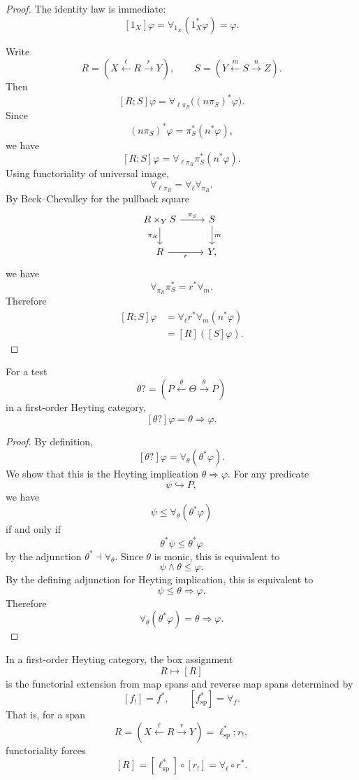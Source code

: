 \begin{proof}
The identity law is immediate:
\[
[1_X]\varphi
=
\forall_{1_X}(1_X^\ast\varphi)
=
\varphi.
\]

Write
\[
R=
\left(
X\xleftarrow{\ell}R\xrightarrow{r}Y
\right),
\qquad
S=
\left(
Y\xleftarrow{m}S\xrightarrow{n}Z
\right).
\]
Then
\[
[R;S]\varphi
=
\forall_{\ell\pi_R}\bigl((n\pi_S)^\ast\varphi\bigr).
\]
Since
\[
(n\pi_S)^\ast\varphi
=
\pi_S^\ast(n^\ast\varphi),
\]
we have
\[
[R;S]\varphi
=
\forall_{\ell\pi_R}\pi_S^\ast(n^\ast\varphi).
\]
Using functoriality of universal image,
\[
\forall_{\ell\pi_R}
=
\forall_\ell\forall_{\pi_R}.
\]
By Beck--Chevalley for the pullback square
\[
\begin{tikzcd}
R\times_Y S \arrow[r, "\pi_S"] \arrow[d, "\pi_R"']
&
S \arrow[d, "m"]
\\
R \arrow[r, "r"'] & Y,
\end{tikzcd}
\]
we have
\[
\forall_{\pi_R}\pi_S^\ast
=
r^\ast\forall_m.
\]
Therefore
\[
\begin{aligned}
[R;S]\varphi
&=
\forall_\ell r^\ast\forall_m(n^\ast\varphi)
\\
&=
[R]([S]\varphi).
\end{aligned}
\]
\end{proof}

\begin{proposition}
\label{prop:box-law-tests}
For a test
\[
\theta?
=
\left(
P\xleftarrow{\theta}\Theta\xrightarrow{\theta}P
\right)
\]
in a first-order Heyting category,
\[
[\theta?]\varphi
=
\theta\Rightarrow\varphi.
\]
\end{proposition}

\begin{proof}
By definition,
\[
[\theta?]\varphi
=
\forall_\theta(\theta^\ast\varphi).
\]
We show that this is the Heyting implication \(\theta\Rightarrow\varphi\). For any predicate
\[
\psi\hookrightarrow P,
\]
we have
\[
\psi\le \forall_\theta(\theta^\ast\varphi)
\]
if and only if
\[
\theta^\ast\psi\le \theta^\ast\varphi
\]
by the adjunction \(\theta^\ast\dashv \forall_\theta\). Since \(\theta\) is monic, this is equivalent to
\[
\psi\wedge\theta\le \varphi.
\]
By the defining adjunction for Heyting implication, this is equivalent to
\[
\psi\le \theta\Rightarrow\varphi.
\]
Therefore
\[
\forall_\theta(\theta^\ast\varphi)
=
\theta\Rightarrow\varphi.
\]
\end{proof}

\begin{theorem}
\label{thm:universal-box-extension}
In a first-order Heyting category, the box assignment
\[
R\longmapsto [R]
\]
is the functorial extension from map spans and reverse map spans determined by
\[
[f_!]=f^\ast,
\qquad
[f^\ast_{\mathrm{sp}}]=\forall_f.
\]
That is, for a span
\[
R=
\left(
X\xleftarrow{\ell}R\xrightarrow{r}Y
\right)
=
\ell^\ast_{\mathrm{sp}};r_!,
\]
functoriality forces
\[
[R]
=
[\ell^\ast_{\mathrm{sp}}]\circ [r_!]
=
\forall_\ell\circ r^\ast.
\]
\end{theorem}

